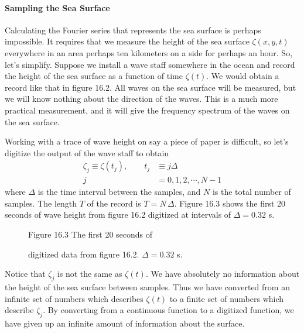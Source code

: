 \paragraph{Sampling the Sea Surface}
Calculating the Fourier series that represents the sea surface is
perhaps impossible. It requires that we measure the height of the sea
surface $\zeta (x,y,t)$ everywhere in an area perhaps ten kilometers
on a side for perhaps an hour. So, let's simplify. Suppose we install
a wave staff somewhere in the ocean and record the height of the sea
surface as a function of time $\zeta (t)$. We would obtain a record
like that in figure 16.2. All waves on the sea surface will be
measured, but we will know nothing about the direction of the
waves. This is a much more practical measurement, and it will give the
frequency spectrum of the waves on the sea surface.

Working with a trace of wave height on say a piece of paper is
difficult, so let's digitize the output of the wave staff to obtain
\begin{align}
  \zeta _{j} \equiv \zeta (t_{j}), \qquad  t_{j} &\equiv j \Delta  \\
  j &= 0, 1, 2, \cdots , N-1 \nonumber
\end{align}
where $\Delta $ is the time interval between the samples, and $N$ is
the total number of samples. The length $T$ of the record is $T = N \,
\Delta $. Figure 16.3 shows the first 20 seconds of wave height from
figure 16.2 digitized at intervals of $\Delta = 0.32$ s.

\begin{figure}[t!]
\centering
{}
\footnotesize
Figure 16.3 The first 20 seconds of \rule{0mm}{3ex}digitized data from
figure 16.2.  $\Delta = 0.32$ s.

\label{fi2:wavepts}
\vspace{-3ex}
\end{figure}

Notice that $\zeta _{j}$ is not the same as $\zeta (t)$. We have
absolutely no information about the height of the sea surface between
samples. Thus we have converted from an infinite set of numbers which
describes $\zeta (t)$ to a finite set of numbers which describe $\zeta
_{j}$. By converting from a continuous function to a digitized
function, we have given up an infinite amount of information about the
surface.

